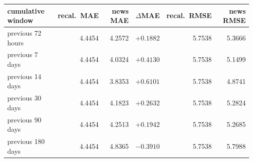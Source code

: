 \begin{tabular}{lrrrrr}
\toprule
cumulative window & recal.\ MAE & news MAE & $\Delta$MAE & recal.\ RMSE & news RMSE \\
\midrule
previous 72 hours & 4.4454 & 4.2572 & $+0.1882$ & 5.7538 & 5.3666 \\
previous 7 days   & 4.4454 & 4.0324 & $+0.4130$ & 5.7538 & 5.1499 \\
previous 14 days  & 4.4454 & 3.8353 & $+0.6101$ & 5.7538 & 4.8741 \\
previous 30 days  & 4.4454 & 4.1823 & $+0.2632$ & 5.7538 & 5.2824 \\
previous 90 days  & 4.4454 & 4.2513 & $+0.1942$ & 5.7538 & 5.2685 \\
previous 180 days & 4.4454 & 4.8365 & $-0.3910$ & 5.7538 & 5.7988 \\
\bottomrule
\end{tabular}
